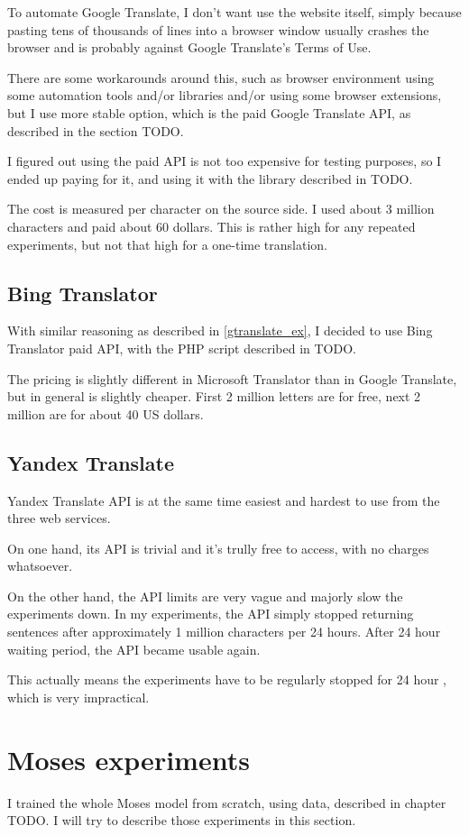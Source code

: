 To automate Google Translate, I don't want use the website itself, simply because pasting tens of thousands of lines into a browser window usually crashes the browser and is probably against Google Translate's Terms of Use.

There are some workarounds around this, such as  browser environment using some automation tools and/or libraries and/or using some browser extensions, but I use more stable option, which is the paid Google Translate API, as described in the section TODO.

I figured out using the paid API is not too expensive for testing purposes, so I ended up paying for it, and using it with the library described in TODO.

The cost is measured per character on the source side. I used about 3 million characters and paid about 60 dollars. This is rather high for any repeated experiments, but not that high for a one-time translation.

\subsection{Bing Translator}
With similar reasoning as described in \ref{gtranslate_ex}, I decided to use Bing Translator paid API, with the PHP script described in TODO.

The pricing is slightly different in Microsoft Translator than in Google Translate, but in general is slightly cheaper. First 2 million letters are for free, next 2 million are for about 40 US dollars.

\subsection{Yandex Translate}
Yandex Translate API is at the same time easiest and hardest to use from the three web services.

On one hand, its API is trivial and it's trully free to access, with no charges whatsoever.

On the other hand, the API limits are very vague and majorly slow the experiments down. In my experiments, the API simply stopped returning sentences after approximately 1 million characters per 24 hours. After 24 hour waiting period, the API became usable again.

This actually means the experiments have to be regularly stopped for 24 hour , which is very impractical.

\section{Moses experiments}
I trained the whole Moses model from scratch, using data, de\-scri\-bed in cha\-pter TO\-DO. I will try to describe those experiments in this section.
